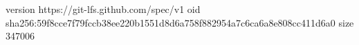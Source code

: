 version https://git-lfs.github.com/spec/v1
oid sha256:59f8cce7f79fccb38ee220b1551d8d6a758f882954a7c6ca6a8e808cc411d6a0
size 347006
